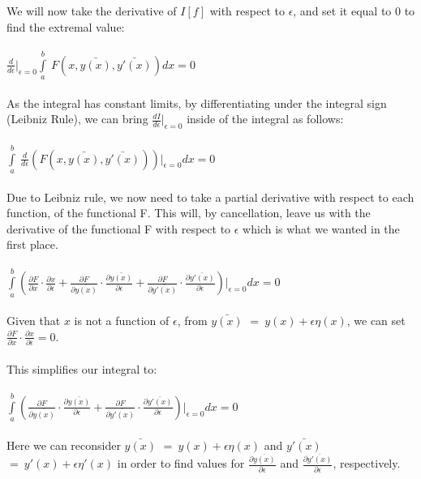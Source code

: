 \documentclass[12pt]{report}
\begin{document}
\\
\\
We will now take the derivative of \(I[f]\) with respect to \(\epsilon\), and set it equal to \(0\) to find the extremal value:
\\
\\
\(\frac{d}{d\epsilon}|_{\epsilon = 0} \int\limits_a^b\ F(x, \bar{y(x)}, \bar{y'(x)})dx = 0\)
\\
\\
As the integral has constant limits, by differentiating under the integral sign (Leibniz Rule), we can bring \(\frac{dI}{d\epsilon}|_{\epsilon = 0}\) inside of the integral as follows:
\\
\\
\( \int\limits_a^b\ \frac{d}{d\epsilon} (F(x, \bar{y(x)}, \bar{y'(x)}))|_{\epsilon = 0}dx = 0\)
\\
\\
Due to Leibniz rule, we now need to take a partial derivative with respect to each function, of the functional F. This will, by cancellation, leave us with the derivative of the functional F with respect to \(\epsilon\) which is what we wanted in the first place.
\\
\\
\(\int\limits_a^b (\frac{\partial F}{\partial x} \cdot \frac{\partial x}{\partial \epsilon} + \frac{\partial F}{\partial \bar{y(x)}} \cdot \frac{\partial\bar{y(x)}}{\partial \epsilon} + \frac{\partial F}{\partial \bar{y'(x)}} \cdot \frac{\partial\bar{y'(x)}}{\partial \epsilon})|_{\epsilon = 0}dx = 0\)
\\
\\
Given that \(x\) is not a function of \(\epsilon\), from $\bar{y(x)}$ \( =\ y(x)+\epsilon\eta (x)\), we can set \(\frac{\partial F}{\partial x} \cdot \frac{\partial x}{\partial \epsilon} = 0\).
\\
\\
This simplifies our integral to:
\\
\\
\(\int\limits_a^b (\frac{\partial F}{\partial \bar{y(x)}} \cdot \frac{\partial\bar{y(x)}}{\partial \epsilon} + \frac{\partial F}{\partial \bar{y'(x)}} \cdot \frac{\partial\bar{y'(x)}}{\partial \epsilon})|_{\epsilon = 0}dx = 0\)
\\
\\
Here we can reconsider $\bar{y(x)}$ \( =\ y(x)+\epsilon\eta (x)\) and $\bar{y'(x)}$ \( =\ y'(x)+\epsilon\eta' (x)\) in order to find values for \(\frac{\partial \bar{y(x)}}{\partial \epsilon}\) and \(\frac{\partial \bar{y'(x)}}{\partial \epsilon}\), respectively.
\end{document}
